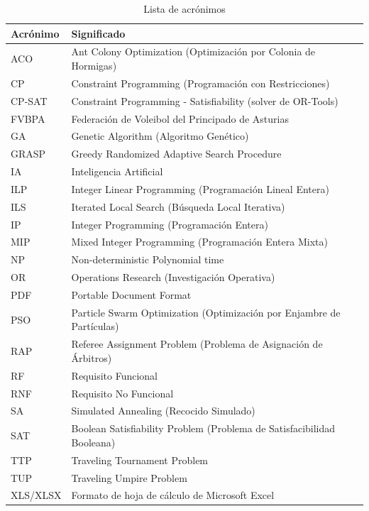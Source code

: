 \documentclass[11pt,a4paper,spanish]{book}
\numberwithin{equation}{chapter}
\numberwithin{figure}{chapter}
\numberwithin{table}{chapter}
\begin{document}
\begin{table}[h]
\centering
\begin{tabular}{|l|p{10cm}|}
\hline
{\bf Acrónimo} & {\bf Significado} \\
\hline
ACO & Ant Colony Optimization (Optimización por Colonia de Hormigas) \\
\hline
CP & Constraint Programming (Programación con Restricciones) \\
\hline
CP-SAT & Constraint Programming - Satisfiability (solver de OR-Tools) \\
\hline
FVBPA & Federación de Voleibol del Principado de Asturias \\
\hline
GA & Genetic Algorithm (Algoritmo Genético) \\
\hline
GRASP & Greedy Randomized Adaptive Search Procedure \\
\hline
IA & Inteligencia Artificial \\
\hline
ILP & Integer Linear Programming (Programación Lineal Entera) \\
\hline
ILS & Iterated Local Search (Búsqueda Local Iterativa) \\
\hline
IP & Integer Programming (Programación Entera) \\
\hline
MIP & Mixed Integer Programming (Programación Entera Mixta) \\
\hline
NP & Non-deterministic Polynomial time \\
\hline
OR & Operations Research (Investigación Operativa) \\
\hline
PDF & Portable Document Format \\
\hline
PSO & Particle Swarm Optimization (Optimización por Enjambre de Partículas) \\
\hline
RAP & Referee Assignment Problem (Problema de Asignación de Árbitros) \\
\hline
RF & Requisito Funcional \\
\hline
RNF & Requisito No Funcional \\
\hline
SA & Simulated Annealing (Recocido Simulado) \\
\hline
SAT & Boolean Satisfiability Problem (Problema de Satisfacibilidad Booleana) \\
\hline
TTP & Traveling Tournament Problem \\
\hline
TUP & Traveling Umpire Problem \\
\hline
XLS/XLSX & Formato de hoja de cálculo de Microsoft Excel \\
\hline
\end{tabular}
\caption{Lista de acrónimos}
\label{tab:acronimos}
\end{table}
\end{document}

